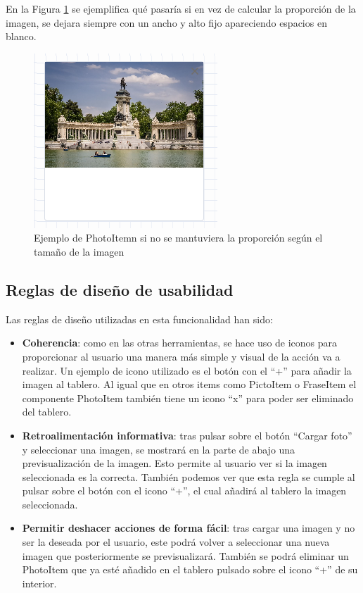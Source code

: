 En la Figura \ref{fig:photoitemerror} se ejemplifica qué pasaría si en vez de calcular la proporción de la imagen, se dejara siempre con un ancho y alto fijo apareciendo espacios en blanco.

\begin{figure}[h!]
	\centering
	\includegraphics[width=0.7\linewidth]{Imagenes/Bitmap/photoItemError}
	\caption{Ejemplo de PhotoItemn si no se mantuviera la proporción según el tamaño de la imagen}
	\label{fig:photoitemerror}
\end{figure}

\subsection{Reglas de diseño de usabilidad}

 Las reglas de diseño utilizadas en esta funcionalidad han sido:
\begin{itemize}
	\item \textbf{Coherencia}: como en las otras herramientas, se hace uso de iconos para proporcionar al usuario una manera más simple y visual de la acción va a realizar. Un ejemplo de icono utilizado es el botón con el “+” para añadir la imagen al tablero. Al igual que en otros items como PictoItem o FraseItem el componente PhotoItem también tiene un icono “x” para poder ser eliminado del tablero.
	
	\item \textbf{Retroalimentación informativa}: tras pulsar sobre el botón “Cargar foto” y seleccionar una imagen, se mostrará en la parte de abajo una previsualización de la imagen. Esto permite al usuario ver si la imagen seleccionada es la correcta.
	También podemos ver que esta regla se cumple al pulsar sobre el botón con el icono “+”, el cual añadirá al tablero la imagen seleccionada.
	
	
	\item \textbf{Permitir deshacer acciones de forma fácil}:  tras cargar una imagen y no ser la deseada por el usuario, este podrá volver a seleccionar una nueva imagen que posteriormente se previsualizará. También se podrá eliminar un PhotoItem que ya esté añadido en el tablero pulsado sobre el icono “+” de su interior.
	
\end{itemize}




